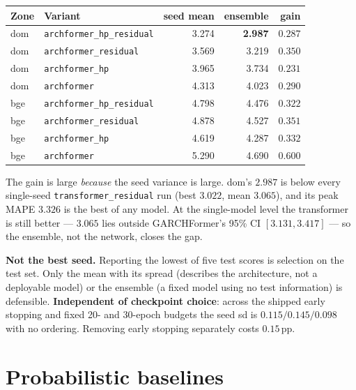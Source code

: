 \documentclass[11pt]{article}
\newcommand{\code}[1]{\texttt{\small #1}}
\begin{document}
\begin{center}\small
\begin{tabular}{@{}llrrr@{}}
\toprule
Zone & Variant & seed mean & ensemble & gain \\
\midrule
dom & \code{archformer\_hp\_residual} & 3.274 & \textbf{2.987} & $0.287$ \\
dom & \code{archformer\_residual}     & 3.569 & 3.219 & $0.350$ \\
dom & \code{archformer\_hp}           & 3.965 & 3.734 & $0.231$ \\
dom & \code{archformer}               & 4.313 & 4.023 & $0.290$ \\
bge & \code{archformer\_hp\_residual} & 4.798 & 4.476 & $0.322$ \\
bge & \code{archformer\_residual}     & 4.878 & 4.527 & $0.351$ \\
bge & \code{archformer\_hp}           & 4.619 & 4.287 & $0.332$ \\
bge & \code{archformer}               & 5.290 & 4.690 & $0.600$ \\
\bottomrule
\end{tabular}
\end{center}

\noindent
The gain is large \emph{because} the seed variance is large. dom's $2.987$ is below
every single-seed \code{transformer\_residual} run (best $3.022$, mean $3.065$), and
its peak MAPE $3.326$ is the best of any model. At the single-model level the
transformer is still better --- $3.065$ lies outside GARCHFormer's 95\% CI
$[3.131, 3.417]$ --- so the ensemble, not the network, closes the gap.

\noindent
\textbf{Not the best seed.} Reporting the lowest of five test scores is selection on
the test set. Only the mean with its spread (describes the architecture, not a
deployable model) or the ensemble (a fixed model using no test information) is
defensible. \textbf{Independent of checkpoint choice}: across the shipped early
stopping and fixed 20- and 30-epoch budgets the seed sd is $0.115/0.145/0.098$ with
no ordering. Removing early stopping separately costs $0.15$\,pp.

\section{Probabilistic baselines}
\end{document}
